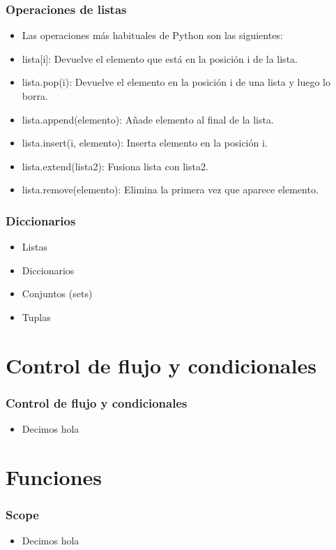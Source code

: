 \documentclass[hyperref={pdfpagelabels=false},xcolor=pst,pdf,fragile]{beamer}
\begin{document}
\begin{frame}
    \frametitle{Operaciones de listas}
    \pause
    \begin{itemize}
    \item Las operaciones más habituales de Python son las siguientes:
    \item lista[i]: Devuelve el elemento que está en la posición i de la lista.
    \item lista.pop(i): Devuelve el elemento en la posición i de una lista y luego lo borra.
    \item lista.append(elemento): Añade elemento al final de la lista.
    \item lista.insert(i, elemento): Inserta elemento en la posición i.
    \item lista.extend(lista2): Fusiona lista con lista2.
    \item lista.remove(elemento): Elimina la primera vez que aparece elemento.
    \end{itemize}
\end{frame}


\begin{frame}
    \frametitle{Diccionarios}
    \pause
    \begin{itemize}
    \item Listas
    \item Diccionarios
    \item Conjuntos (sets)
    \item Tuplas
    \end{itemize}
\end{frame}

\section{Control de flujo y condicionales}
\begin{frame}
    \frametitle{Control de flujo y condicionales}
    \pause
    \begin{itemize}
    \item Decimos hola
    \end{itemize}
\end{frame}

\section{Funciones}
\begin{frame}
    \frametitle{Scope}
    \pause
    \begin{itemize}
    \item Decimos hola
    \end{itemize}
\end{frame}
\end{document}
